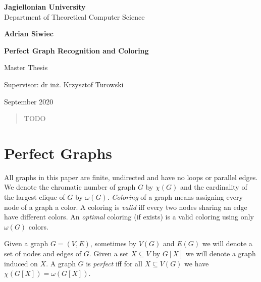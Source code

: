 \documentclass{article}
\author{Adrian Siwiec}
\date{\today{}}
\begin{document}
\begin{titlepage}
	\begin{center}
        
		\large
		\textbf{Jagiellonian University}\\
		Department of Theoretical Computer Science\\

		\vspace{1.5cm}

		\Large
		\textbf{Adrian Siwiec}

		\vspace*{2cm}

		\textbf{\LARGE Perfect Graph Recognition and Coloring}
		
		\vspace{0.5cm}
		\large
		
		\vfill
		\Large
		Master Thesis

		\vfill
		\Large
		Supervisor: dr inż. Krzysztof Turowski
		
		\vspace{0.8cm}
		
		September 2020
		
\end{center}
\end{titlepage}

\pagebreak

\begin{abstract}
TODO
\end{abstract}

\tableofcontents

\pagebreak

\section{Perfect Graphs}
All graphs in this paper are finite, undirected and have no loops or parallel edges. We denote the chromatic number of graph $G$ by $\chi(G)$ and the cardinality of the largest clique of $G$ by $\omega(G)$. \emph{Coloring} of a graph means assigning every node of a graph a color. A coloring is \emph{valid} iff every two nodes sharing an edge have different colors. An \emph{optimal} coloring (if exists) is a valid coloring using only $\omega(G)$ colors.

Given a graph $G = (V,E)$, sometimes by $V(G)$ and $E(G)$ we will denote a set of nodes and edges of $G$. Given a set $X \subseteq V$ by $G[X]$ we will denote a graph induced on $X$. A graph $G$ is \emph{perfect} iff for all $X \subseteq V(G)$ we have $\chi(G[X]) = \omega(G[X])$.
\end{document}
